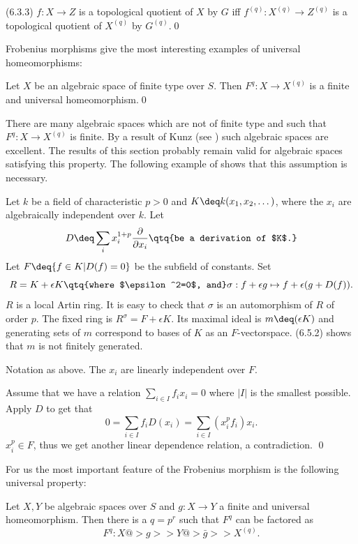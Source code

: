(6.3.3) $f:X\to Z$ is a topological quotient of $X$ by $G$ iff
$f^{(q)}:X^{(q)}\to Z^{(q)}$ is a  topological quotient of $X^{(q)}$ by
$G^{(q)}$.\qed
\endproclaim

Frobenius morphisms give the most interesting examples of
universal homeomorphisms:




  Let $X$ be an algebraic space of finite type over
$S$. Then
$F^q:X\to X^{(q)}$ is a finite and universal homeomorphism.\qed
\endproclaim



 There are many algebraic spaces which are not of finite
type and such  that $F^q:X\to X^{(q)}$ is  finite. By a result of Kunz (see
\cite{Matsumura80, p.302}) such algebraic spaces are excellent.
The results of this section  probably  remain valid for algebraic spaces
satisfying this property. The following example of \cite{Nagata69} shows that
this assumption is necessary.
\enddemo

 Let $k$ be a field of characteristic
$p>0$  and $K\deq k(x_1,x_2,\dots)$, where the
$x_i$ are algebraically independent over $k$.  Let
$$
D\deq \sum_ix_i^{1+p}\frac{\partial}{\partial x_i}\qtq{be a derivation of $K$.}
$$
Let $F\deq\{f\in K\vert D(f)=0\}$ be the subfield of constants.
Set
$$
R=K+\epsilon K\qtq{where $\epsilon^2=0$, and} \sigma: f+\epsilon g\mapsto
f+\epsilon (g+D(f)).
$$
$R$ is a local Artin ring.
It is easy to check that $\sigma$ is an automorphism of $R$ of order $p$.
The fixed ring is $R^{\sigma}=F+\epsilon K$. Its maximal ideal is
$m\deq (\epsilon K)$ and  generating sets of $m$ correspond to  bases
of $K$ as an $F$-vectorspace. (6.5.2) shows that $m$ is not
finitely generated.

 Notation as above. The $x_i$ are linearly independent
over
$F$.
\endproclaim

\demop Assume that we have a relation $\sum_{i\in I} f_ix_i=0$
where $|I|$ is the smallest possible. Apply $D$ to
get that
$$
0=\sum_{i\in I} f_iD(x_i)=\sum_{i\in I} (x_i^pf_i)x_i.
$$
$x_i^p\in F$, thus
we get another linear dependence relation, a contradiction.
\qed\enddemo\enddemo


For us the most important feature of the Frobenius morphism is the
following universal property:

  Let $X,Y$ be  algebraic spaces over  $S$  and
$g:X\to Y$ a finite  and universal homeomorphism. Then there is a $q=p^r$
such that   $F^q$ can be factored as
$$
F^q:X@>g>>Y @>\bar g>> X^{(q)}.
$$


